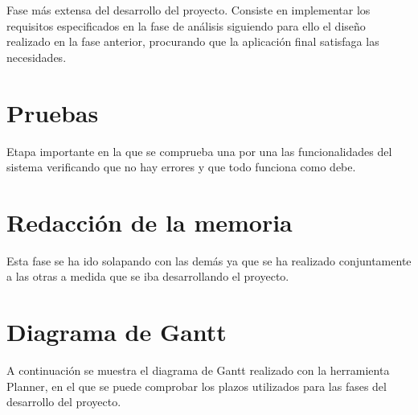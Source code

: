 Fase más extensa del desarrollo del proyecto. Consiste en implementar los requisitos especificados en la fase de análisis siguiendo para ello el diseño realizado en la fase anterior, procurando que la aplicación final satisfaga las necesidades.

\section{Pruebas}

Etapa importante en la que se comprueba una por una las funcionalidades del sistema verificando que no hay errores y que todo funciona como debe.

\section{Redacción de la memoria}
Esta fase se ha ido solapando con las demás ya que se ha realizado conjuntamente a las otras a medida que se iba desarrollando el proyecto. 

\section{Diagrama de Gantt}
A continuación se muestra el diagrama de Gantt realizado con la herramienta Planner, en el que se puede comprobar los plazos utilizados para las fases del desarrollo del proyecto.
\newpage




